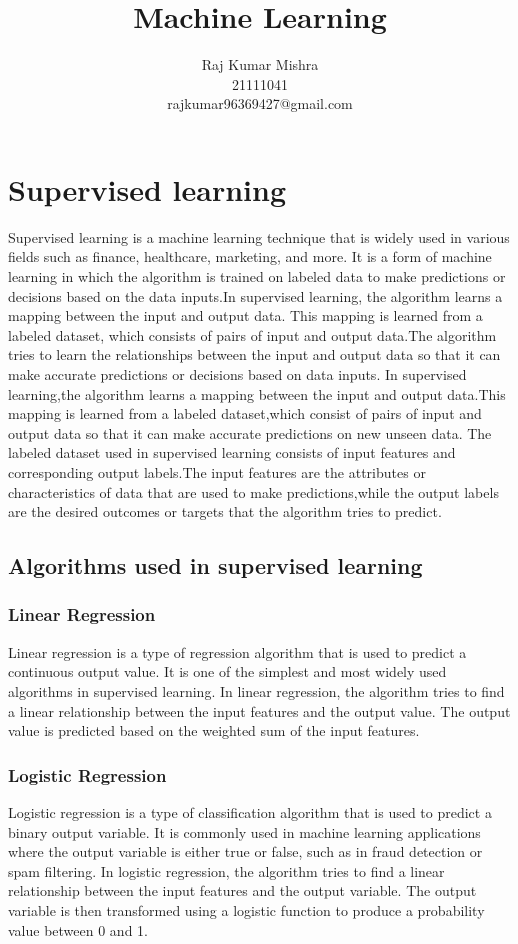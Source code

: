 \documentclass[12pt]{article}
\title{Machine Learning}
\author{Raj Kumar Mishra\\21111041\\rajkumar96369427@gmail.com}
\begin{document}
\maketitle
\tableofcontents
 \section{Supervised learning}
 Supervised learning is a machine learning technique that is widely used in various fields such as finance, healthcare, marketing, and more. It is a form of machine learning in which the algorithm is trained on labeled data to make predictions or decisions based on the data inputs.In supervised learning, the algorithm learns a mapping between the input and output data. This mapping is learned from a labeled dataset, which consists of pairs of input and output data.The algorithm tries to learn the relationships between the input and output data so that it can make accurate predictions or decisions based on data inputs.
In supervised learning,the algorithm learns a mapping between the input and output data.This mapping is learned from a labeled dataset,which consist of pairs of input and output  data so that it can make accurate predictions on new unseen data.
The labeled dataset used in supervised learning consists of input features and corresponding output labels.The input features are the attributes or characteristics of data that are used to make predictions,while the output labels are the desired outcomes or targets that the algorithm tries to predict.
\subsection{Algorithms used in supervised learning}
 \subsubsection{Linear Regression}
Linear regression is a type of regression algorithm that is used to predict a continuous output value. It is one of the simplest and most widely used algorithms in supervised learning. In linear regression, the algorithm tries to find a linear relationship between the input features and the output value. The output value is predicted based on the weighted sum of the input features.

 \subsubsection{Logistic Regression}
Logistic regression is a type of classification algorithm that is used to predict a binary output variable. It is commonly used in machine learning applications where the output variable is either true or false, such as in fraud detection or spam filtering. In logistic regression, the algorithm tries to find a linear relationship between the input features and the output variable. The output variable is then transformed using a logistic function to produce a probability value between 0 and 1.
\end{document}
